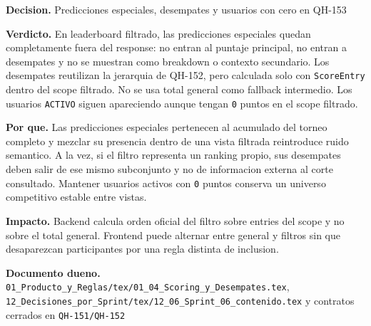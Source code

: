 \begin{docnote}
\textbf{Decision.} Predicciones especiales, desempates y usuarios con cero en QH-153

\textbf{Verdicto.} En leaderboard filtrado, las predicciones especiales quedan completamente fuera del response: no entran al puntaje principal, no entran a desempates y no se muestran como breakdown o contexto secundario. Los desempates reutilizan la jerarquia de QH-152, pero calculada solo con \texttt{ScoreEntry} dentro del scope filtrado. No se usa total general como fallback intermedio. Los usuarios \texttt{ACTIVO} siguen apareciendo aunque tengan \texttt{0} puntos en el scope filtrado.

\textbf{Por que.} Las predicciones especiales pertenecen al acumulado del torneo completo y mezclar su presencia dentro de una vista filtrada reintroduce ruido semantico. A la vez, si el filtro representa un ranking propio, sus desempates deben salir de ese mismo subconjunto y no de informacion externa al corte consultado. Mantener usuarios activos con \texttt{0} puntos conserva un universo competitivo estable entre vistas.

\textbf{Impacto.} Backend calcula orden oficial del filtro sobre entries del scope y no sobre el total general. Frontend puede alternar entre general y filtros sin que desaparezcan participantes por una regla distinta de inclusion.

\textbf{Documento dueno.} \texttt{01\_Producto\_y\_Reglas/tex/01\_04\_Scoring\_y\_Desempates.tex}, \texttt{12\_Decisiones\_por\_Sprint/tex/12\_06\_Sprint\_06\_contenido.tex} y contratos cerrados en \texttt{QH-151/QH-152}
\end{docnote}

